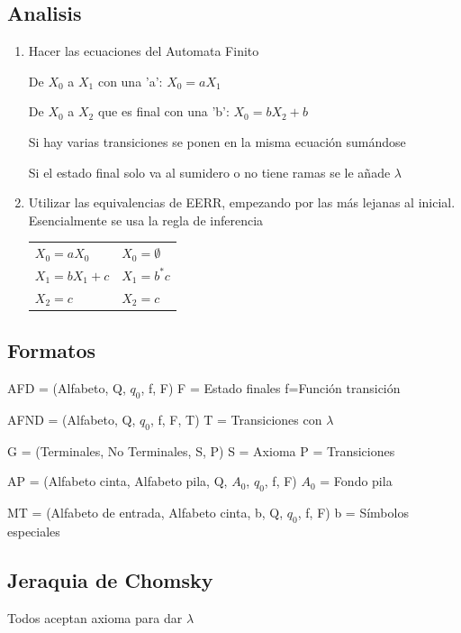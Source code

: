 \documentclass[12pt, twoside, openright]{report} %
\begin{document}
\subsection{Analisis}
\begin{enumerate}
	\item Hacer las ecuaciones del Automata Finito

	De $X_0$ a $X_1$ con una 'a': $X_0 = aX_1$

	De $X_0$ a $X_2$ que es final con una 'b': $X_0 = b X_2 + b$

	Si hay varias transiciones se ponen en la misma ecuación sumándose

	Si el estado final solo va al sumidero o no tiene ramas se le añade $\lambda$

	\item Utilizar las equivalencias de EERR, empezando por las más lejanas al inicial. Esencialmente se usa la regla de inferencia
	\begin{table}[H]
		\centering\begin{tabular}{ll}
			$X_0 = aX_0$ & $X_0 = \emptyset$ \\
			$X_1 = bX_1 + c$ & $X_1 = b^*c$ \\
			$X_2 = c$ & $X_2 = c$ \\
		\end{tabular}
	\end{table}
\end{enumerate}

\subsection{Formatos}
AFD = (Alfabeto, Q, $q_0$, f, F) F = Estado finales f=Función transición

AFND = (Alfabeto, Q, $q_0$, f, F, T) T = Transiciones con $\lambda$

G = (Terminales, No Terminales, S, P) S = Axioma P = Transiciones

AP = (Alfabeto cinta, Alfabeto pila, Q, $A_0$, $q_0$, f, F)  $A_0$ = Fondo pila

MT = (Alfabeto de entrada, Alfabeto cinta, b, Q, $q_0$, f, F) b = Símbolos especiales

\subsection{Jeraquia de Chomsky}
Todos aceptan axioma para dar $\lambda$
\end{document}
